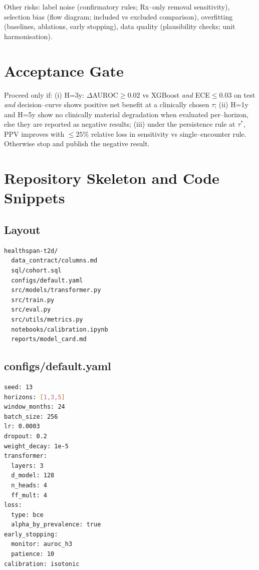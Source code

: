 \documentclass[11pt]{article}
\begin{document}
Other risks: label noise (confirmatory rules; Rx--only removal sensitivity), selection bias (flow diagram; included vs excluded comparison), overfitting (baselines, ablations, early stopping), data quality (plausibility checks; unit harmonisation).

\section{Acceptance Gate}
Proceed only if: (i) H=3y: $\Delta$AUROC$\ge0.02$ vs XGBoost \emph{and} ECE$\le0.03$ on test \emph{and} decision--curve shows positive net benefit at a clinically chosen $\tau$; (ii) H=1y and H=5y show no clinically material degradation when evaluated per--horizon, else they are reported as negative results; (iii) under the persistence rule at $\tau^*$, PPV improves with $\le25\%$ relative loss in sensitivity vs single--encounter rule. Otherwise stop and publish the negative result.

\section{Repository Skeleton and Code Snippets}
\subsection{Layout}
\begin{lstlisting}
healthspan-t2d/
  data_contract/columns.md
  sql/cohort.sql
  configs/default.yaml
  src/models/transformer.py
  src/train.py
  src/eval.py
  src/utils/metrics.py
  notebooks/calibration.ipynb
  reports/model_card.md
\end{lstlisting}

\subsection{configs/default.yaml}
\begin{lstlisting}[language=bash]
seed: 13
horizons: [1,3,5]
window_months: 24
batch_size: 256
lr: 0.0003
dropout: 0.2
weight_decay: 1e-5
transformer:
  layers: 3
  d_model: 128
  n_heads: 4
  ff_mult: 4
loss:
  type: bce
  alpha_by_prevalence: true
early_stopping:
  monitor: auroc_h3
  patience: 10
calibration: isotonic
\end{lstlisting}
\end{document}
